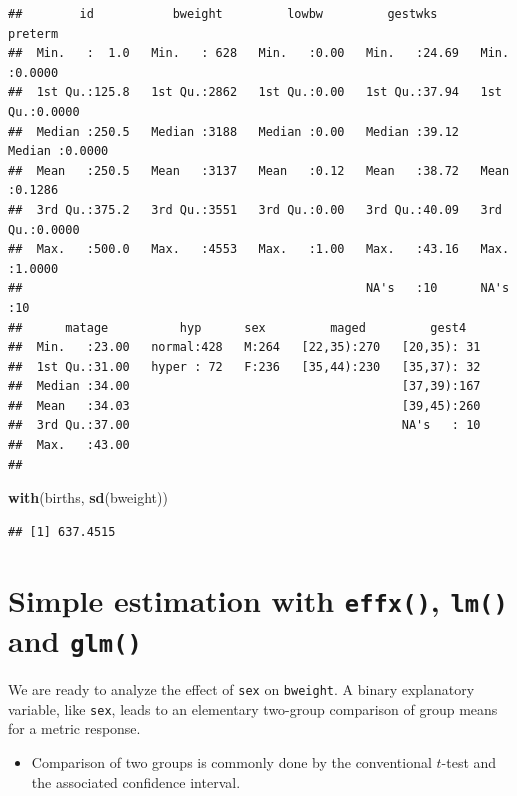 \documentclass[
]{book}
\newenvironment{Shaded}{\begin{snugshade}}{\end{snugshade}}
\newcommand{\FunctionTok}[1]{\textcolor[rgb]{0.13,0.29,0.53}{\textbf{#1}}}
\newcommand{\NormalTok}[1]{#1}
\providecommand{\tightlist}{%
  \setlength{\itemsep}{0pt}\setlength{\parskip}{0pt}}
\begin{document}
\begin{verbatim}
##        id           bweight         lowbw         gestwks         preterm      
##  Min.   :  1.0   Min.   : 628   Min.   :0.00   Min.   :24.69   Min.   :0.0000  
##  1st Qu.:125.8   1st Qu.:2862   1st Qu.:0.00   1st Qu.:37.94   1st Qu.:0.0000  
##  Median :250.5   Median :3188   Median :0.00   Median :39.12   Median :0.0000  
##  Mean   :250.5   Mean   :3137   Mean   :0.12   Mean   :38.72   Mean   :0.1286  
##  3rd Qu.:375.2   3rd Qu.:3551   3rd Qu.:0.00   3rd Qu.:40.09   3rd Qu.:0.0000  
##  Max.   :500.0   Max.   :4553   Max.   :1.00   Max.   :43.16   Max.   :1.0000  
##                                                NA's   :10      NA's   :10      
##      matage          hyp      sex         maged         gest4    
##  Min.   :23.00   normal:428   M:264   [22,35):270   [20,35): 31  
##  1st Qu.:31.00   hyper : 72   F:236   [35,44):230   [35,37): 32  
##  Median :34.00                                      [37,39):167  
##  Mean   :34.03                                      [39,45):260  
##  3rd Qu.:37.00                                      NA's   : 10  
##  Max.   :43.00                                                   
## 
\end{verbatim}

\begin{Shaded}
\begin{Highlighting}[]
\FunctionTok{with}\NormalTok{(births, }\FunctionTok{sd}\NormalTok{(bweight))}
\end{Highlighting}
\end{Shaded}

\begin{verbatim}
## [1] 637.4515
\end{verbatim}

\section{\texorpdfstring{Simple estimation with \texttt{effx()}, \texttt{lm()} and \texttt{glm()}}{Simple estimation with effx(), lm() and glm()}}\label{simple-estimation-with-effx-lm-and-glm}

We are ready to analyze the effect of \texttt{sex} on \texttt{bweight}.
A binary explanatory variable, like \texttt{sex}, leads to an elementary
two-group comparison of group
means for a metric response.

\begin{itemize}
\tightlist
\item
  Comparison of two groups is commonly done by the conventional \(t\)-test and
  the associated confidence interval.
\end{itemize}
\end{document}

